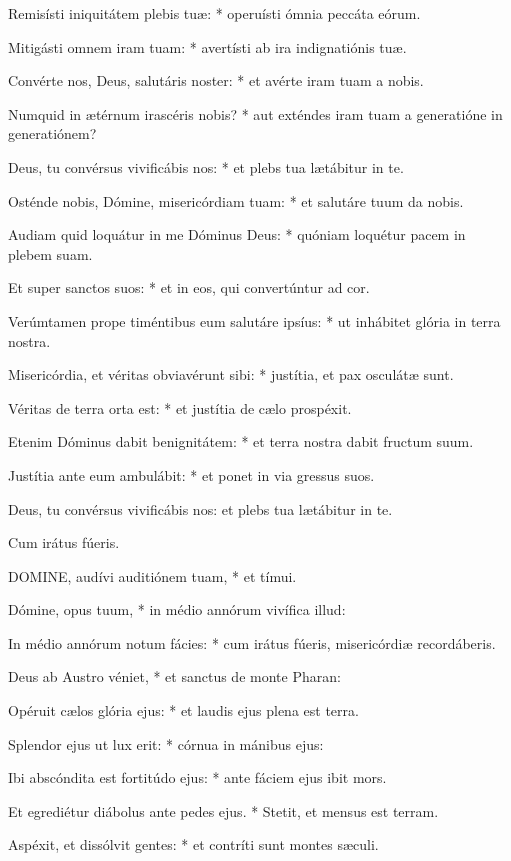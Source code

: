 Remisísti iniquitátem plebis tuæ: * operuísti ómnia peccáta eórum.

Mitigásti omnem iram tuam: * avertísti ab ira indignatiónis tuæ.

Convérte nos, Deus, salutáris noster: * et avérte iram tuam a nobis.

Numquid in ætérnum irascéris nobis? * aut exténdes iram tuam a generatióne in generatiónem?

Deus, tu convérsus vivificábis nos: * et plebs tua lætábitur in te.

Osténde nobis, Dómine, misericórdiam tuam: * et salutáre tuum da nobis.

Audiam quid loquátur in me Dóminus Deus: * quóniam loquétur pacem in plebem suam.

Et super sanctos suos: * et in eos, qui convertúntur ad cor.

Verúmtamen prope timéntibus eum salutáre ipsíus: * ut inhábitet glória in terra nostra.

Misericórdia, et véritas obviavérunt sibi: * justítia, et pax osculátæ sunt.

Véritas de terra orta est: * et justítia de cælo prospéxit.

Etenim Dóminus dabit benignitátem: * et terra nostra dabit fructum suum.

Justítia ante eum ambulábit: * et ponet in via gressus suos.

 Deus, tu convérsus vivificábis nos: et plebs tua lætábitur in te.

 Cum irátus fúeris.


\lettrine[lines=2]{D}{OMINE}, audívi auditiónem tuam, * et tímui.

Dómine, opus tuum, * in médio annórum vivífica illud:

In médio annórum notum fácies: * cum irátus fúeris, misericórdiæ recordáberis.

Deus ab Austro véniet, * et sanctus de monte Pharan:

Opéruit cælos glória ejus: * et laudis ejus plena est terra.

Splendor ejus ut lux erit: * córnua in mánibus ejus:

Ibi abscóndita est fortitúdo ejus: * ante fáciem ejus ibit mors.

Et egrediétur diábolus ante pedes ejus. * Stetit, et mensus est terram.

Aspéxit, et dissólvit gentes: * et contríti sunt montes sæculi.

